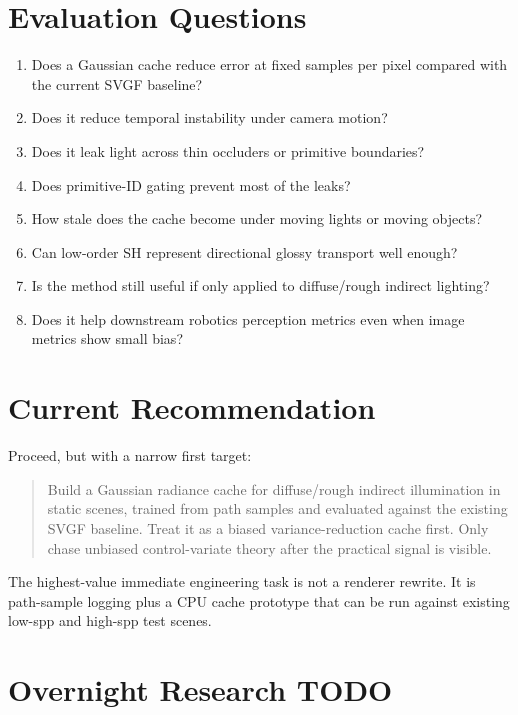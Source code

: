 \documentclass[11pt]{article}
\begin{document}
\section{Evaluation Questions}

\begin{enumerate}
  \item Does a Gaussian cache reduce error at fixed samples per pixel compared
        with the current SVGF baseline?
  \item Does it reduce temporal instability under camera motion?
  \item Does it leak light across thin occluders or primitive boundaries?
  \item Does primitive-ID gating prevent most of the leaks?
  \item How stale does the cache become under moving lights or moving objects?
  \item Can low-order SH represent directional glossy transport well enough?
  \item Is the method still useful if only applied to diffuse/rough indirect
        lighting?
  \item Does it help downstream robotics perception metrics even when image
        metrics show small bias?
\end{enumerate}

\section{Current Recommendation}

Proceed, but with a narrow first target:

\begin{quote}
Build a Gaussian radiance cache for diffuse/rough indirect illumination in
static scenes, trained from path samples and evaluated against the existing
SVGF baseline. Treat it as a biased variance-reduction cache first. Only chase
unbiased control-variate theory after the practical signal is visible.
\end{quote}

The highest-value immediate engineering task is not a renderer rewrite. It is
path-sample logging plus a CPU cache prototype that can be run against existing
low-spp and high-spp test scenes.

\section{Overnight Research TODO}
\end{document}
